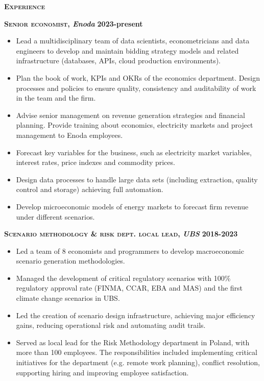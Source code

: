 \documentclass[11pt, a4paper]{article}
\newcommand{\dates}[1]{\hfill\mbox{\textbf{#1}}} %
\newcommand{\headright}[1]{\vspace*{2.5ex}\textsc{\Large\color{cvblue}#1}\par
     \vspace*{-2ex}{\color{cvblue}\hrulefill}\par}
\newcommand{\titlejob}[3]{ %
		\textbf{\textsc{#1}, \textit{#2}} \dates{#3}\\}
\begin{document}
\begin{minipage}[t]{0.56\textwidth}
\setlength{\parskip}{0.8ex}%

\vspace{2ex}

\headright{\textbf{Experience}}
\small

\titlejob{Senior economist}{Enoda}{2023-present}
\begin{itemize}
	\vspace*{-\baselineskip}
	\item Lead a multidisciplinary team of data scientists, econometricians and data engineers to develop and maintain bidding strategy models and related infrastructure (databases, APIs, cloud production environments). 
	\item Plan the book of work, KPIs and OKRs of the economics department. Design processes and policies to ensure quality, consistency and auditability of work in the team and the firm. 
	\item Advise senior management on revenue generation strategies and financial planning. Provide training about economics, electricity markets and project management to Enoda employees. 
	\item Forecast key variables for the business, such as electricity market variables, interest rates, price indexes and commodity prices. 
	\item Design data processes to handle large data sets (including extraction, quality control and storage) achieving full automation. 
	\item Develop microeconomic models of energy markets to forecast firm revenue under different scenarios.
\end{itemize}

\titlejob{Scenario methodology \& risk dept. local lead}{UBS}{2018-2023}
\begin{itemize}
	\vspace*{-\baselineskip}
	\item Led a team of 8 economists and programmers to develop macroeconomic scenario generation methodologies. 
	\item Managed the development of critical regulatory scenarios with 100\% regulatory approval rate (FINMA, CCAR, EBA and MAS) and the first climate change scenarios in UBS. 
	\item Led the creation of scenario design infrastructure, achieving major efficiency gains, reducing operational risk and automating audit trails. 
	\item Served as local lead for the Risk Methodology department in Poland, with more than 100 employees. The responsibilities included implementing critical initiatives for the department (e.g. remote work planning), conflict resolution, supporting hiring and improving employee satisfaction.
\end{itemize}


\end{minipage}
\end{document}
